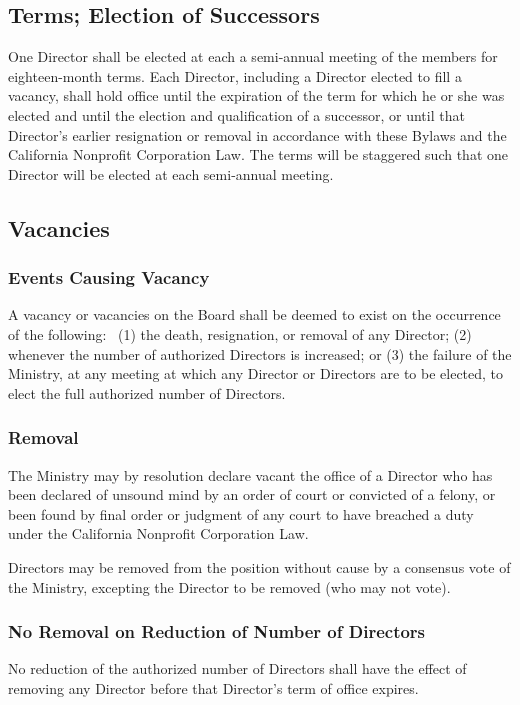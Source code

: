 \documentclass[letterpaper,titlepage]{article}
\begin{document}
\subsection{Terms; Election of Successors}
\label{sec:terms}
One Director shall be elected at each a semi-annual meeting of the members for eighteen-month terms. Each Director, including a Director elected to fill a vacancy, shall hold office until the expiration of the term for which he or she was elected and until the election and qualification of a successor, or until that Director’s earlier resignation or removal in accordance with these Bylaws and the California Nonprofit Corporation Law. The terms will be staggered such that one Director will be elected at each semi-annual meeting.
\subsection{Vacancies}
\label{sec:vacancies}
\subsubsection{Events Causing Vacancy}
\label{sec:eventsVacancy}
A vacancy or vacancies on the Board shall be deemed to exist on the occurrence of the following:  (1) the death, resignation, or removal of any Director; (2) whenever the number of authorized Directors is increased; or (3) the failure of the Ministry, at any meeting at which any Director or Directors are to be elected, to elect the full authorized number of Directors.
\subsubsection{Removal}
\label{sec:removal}
The Ministry may by resolution declare vacant the office of a Director who has been declared of unsound mind by an order of court or convicted of a felony, or been found by final order or judgment of any court to have breached a duty under the California Nonprofit Corporation Law.

Directors may be removed from the position without cause by a consensus vote of the Ministry, excepting the Director to be removed (who may not vote).
\subsubsection{No Removal on Reduction of Number of Directors}
\label{sec:noRemoval}
No reduction of the authorized number of Directors shall have the effect of removing any Director before that Director’s term of office expires.
\end{document}
